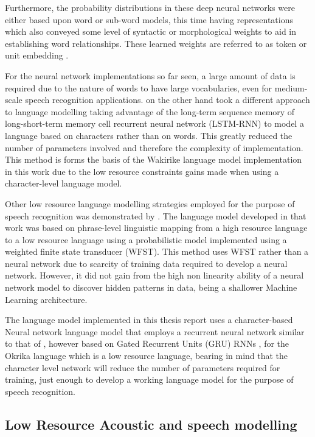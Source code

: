 Furthermore, the probability distributions in these deep neural networks were either based upon word or sub-word models, this time having representations which also conveyed some level of syntactic or morphological weights to aid in establishing word relationships.  These learned weights are referred to as token or unit embedding \citep{pennington-etal-2014-glove}.

For the neural network implementations so far seen, a large amount of data is required due to the nature of words to have large vocabularies, even for medium-scale speech recognition applications.   \cite{kim2016character} on the other hand took a different approach to language modelling taking advantage of the long-term sequence memory of long-short-term memory cell recurrent neural network (LSTM-RNN) to model a language based on characters rather than on words.  This greatly reduced the number of parameters involved and therefore the complexity of implementation.  This method is forms the basis of the Wakirike language model implementation in this work due to the low resource constraints gains made when using a character-level language model.

Other low resource language modelling strategies employed for the purpose of speech recognition was demonstrated by \cite{xu2013cross}.  The language model developed in that work was based on phrase-level linguistic mapping from a high resource language to a low resource language using a probabilistic model implemented using a weighted finite state transducer (WFST). This method uses WFST rather than a neural network due to scarcity of training data required to develop a neural network. However, it did not gain from the high non linearity ability of a neural network model to discover hidden patterns in data, being a shallower Machine Learning architecture.

The language model implemented in this thesis report uses a character-based Neural network language model that employs a recurrent neural network similar to that of \cite{kim2016character}, however based on Gated Recurrent Units (GRU) RNNs \cite{cho2014learning}, for the Okrika language which is a low resource language, bearing in mind that the character level network will reduce the number of parameters required for training, just enough to develop a working language model for the purpose of speech recognition. 

\subsection{Low Resource Acoustic and speech modelling}

